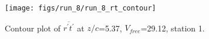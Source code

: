 \begin{figure}[H]
\centering
\texttt{[image: figs/run\_8/run\_8\_rt\_contour]}
\caption{Contour plot of $\overline{r^\prime t^\prime}$ at $z/c$=5.37, $V_{free}$=29.12, station 1.}
\label{fig:run_8_rt_contour}
\end{figure}


